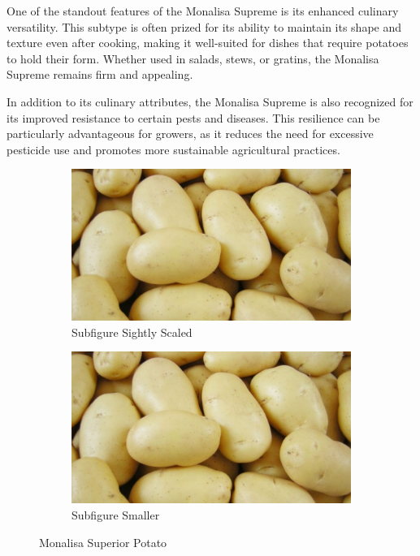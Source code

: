 \documentclass[../../../../main.tex]{subfiles}
\begin{document}
One of the standout features of the Monalisa Supreme is its enhanced culinary versatility. This subtype is often prized for its ability to maintain its shape and texture even after cooking, making it well-suited for dishes that require potatoes to hold their form. Whether used in salads, stews, or gratins, the Monalisa Supreme remains firm and appealing.

In addition to its culinary attributes, the Monalisa Supreme is also recognized for its improved resistance to certain pests and diseases. This resilience can be particularly advantageous for growers, as it reduces the need for excessive pesticide use and promotes more sustainable agricultural practices.

\begin{figure}[!htbp]
    \centering
    \begin{subfigure}{0.60\textwidth}
        \includegraphics[width=\textwidth]{./figures/potato_monalisa_superior.jpg}
        \caption{Subfigure Sightly Scaled}
    \end{subfigure}
    \hfill
    \begin{subfigure}{0.35\textwidth}
        \includegraphics[width=\textwidth]{./figures/potato_monalisa_superior.jpg}
        \caption{Subfigure Smaller}
    \end{subfigure}
    \caption{Monalisa Superior Potato}
\end{figure}
\end{document}
